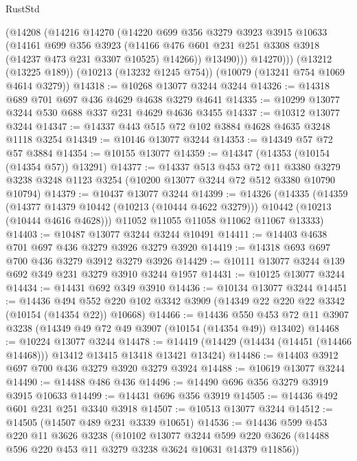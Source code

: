 \begin{lexlean}{RustStd}
\begin{coremodule}
{\begin{coremodule}
{{{{{{{{{{{{{{{{{{{{{{{{{{          (@14208
            (@14216
              @14270
              (@14220
                @699
                @356
                @3279
                @3923
                @3915
                @10633
                (@14161
                  @699
                  @356
                  @3923
                  (@14166 @476 @601 @231 @251 @3308 @3918 (@14237 @473 @231 @3307 @10525) @14266))
                @13490)))
          @14270)))
    (@13212 (@13225 @189))
    (@10213 (@13232 @1245 @754))
    (@10079 (@13241 @754 @1069 @4614 @3279))
@14318 := @10268 @13077 @3244 @3244
@14326 := @14318 @689 @701 @697 @436 @4629 @4638 @3279 @4641
@14335 := @10299 @13077 @3244 @530 @688 @337 @231 @4629 @4636 @3455
@14337 := @10312 @13077 @3244
@14347 := @14337 @443 @515 @72 @102 @3884 @4628 @4635 @3248 @1118 @3254
@14349 := @10146 @13077 @3244
@14353 := @14349 @57 @72 @57 @3884
@14354 := @10155 @13077
@14359 := @14347 (@14353 (@10154 (@14354 @57)) @13291)
@14377 := @14337
    @513
    @453
    @72
    @11
    @3380
    @3279
    @3238
    @3248
    @1123
    @3254
    (@10200 @13077 @3244 @72 @512 @3380 @10790 @10794)
@14379 := @10437 @13077 @3244
@14399 := @14326
    (@14335
      (@14359
        (@14377 @14379 @10442 (@10213 (@10444 @4622 @3279)))
        @10442
        (@10213 (@10444 @4616 @4628)))
      @11052
      @11055
      @11058
      @11062
      @11067
      @13333)
@14403 := @10487 @13077 @3244 @3244 @10491
@14411 := @14403 @4638 @701 @697 @436 @3279 @3926 @3279 @3920
@14419 := @14318 @693 @697 @700 @436 @3279 @3912 @3279 @3926
@14429 := @10111 @13077 @3244 @139 @692 @349 @231 @3279 @3910 @3244 @1957
@14431 := @10125 @13077 @3244
@14434 := @14431 @692 @349 @3910
@14436 := @10134 @13077 @3244
@14451 := @14436
    @494
    @552
    @220
    @102
    @3342
    @3909
    (@14349 @22 @220 @22 @3342 (@10154 (@14354 @22)) @10668)
@14466 := @14436
    @550
    @453
    @72
    @11
    @3907
    @3238
    (@14349 @49 @72 @49 @3907 (@10154 (@14354 @49)) @13402)
@14468 := @10224 @13077 @3244
@14478 := @14419 (@14429 (@14434 (@14451 (@14466 @14468))) @13412 @13415 @13418 @13421 @13424)
@14486 := @14403 @3912 @697 @700 @436 @3279 @3920 @3279 @3924
@14488 := @10619 @13077 @3244
@14490 := @14488 @486 @436
@14496 := @14490 @696 @356 @3279 @3919 @3915 @10633
@14499 := @14431 @696 @356 @3919
@14505 := @14436 @492 @601 @231 @251 @3340 @3918
@14507 := @10513 @13077 @3244
@14512 := @14505 (@14507 @489 @231 @3339 @10651)
@14536 := @14436
    @599
    @453
    @220
    @11
    @3626
    @3238
    (@10102
      @13077
      @3244
      @599
      @220
      @3626
      (@14488 @596 @220 @453 @11 @3279 @3238 @3624 @10631 @14379 @11856))
}}}}}}}}}}}}}}}}}}}}}}}}}}
\end{coremodule}}
\end{coremodule}
\end{lexlean}

